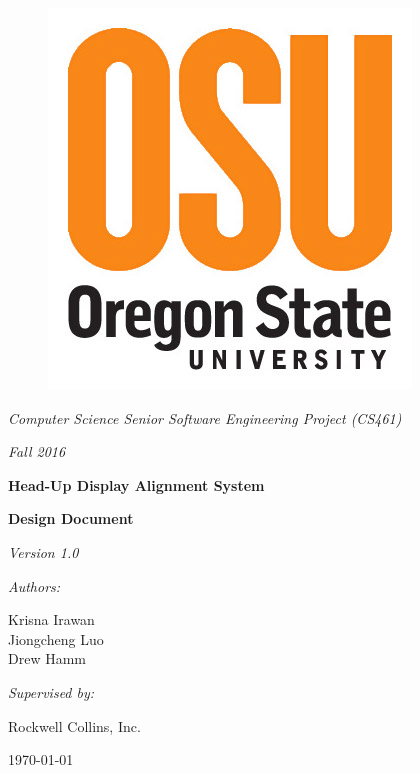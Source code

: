 \documentclass[letterpaper,10pt,onecolumn]{IEEEtran}
\def\name{Krisna Irawan\\ Jiongcheng Luo\\ Drew Hamm}
\def\doc{Design Document}
\def\version{Version 1.0}
\begin{document}
\begin{titlepage}
	\centering
	\begin{figure}
		\centering
	      	\includegraphics[scale=0.3]{osu_logo}
	\end{figure}
	{\Large\itshape Computer Science Senior Software Engineering Project (CS461)\par}
	{\Large\itshape Fall 2016\par}
	\vspace{1cm}
	{\huge\bfseries Head-Up Display Alignment System\par}
	\vspace{5mm}
	{\huge\bfseries \doc\par}
	\vspace{5mm}
	{\large\itshape \version\par}
	\vspace{1cm}
	{\large\itshape Authors:\par}
	{\large \name\par}
	\vspace{1cm}
	{\large\itshape Supervised by:\par}
	{\large Rockwell Collins, Inc.\par}
	\vspace{3cm}


	\begin{abstract}
		A Head-up Display (HUD) Alignment system is developed as a proof of concept aims to explore a potential technological innovation for the HUD system that presents critical flight information to pilots. The primary objective of this project is to reduce the cost and time required to precisely align flight information to the HUD by introducing an additional sensor component to the system to make the alignment process more dynamic. This document is intended for use by Rockwell Collins and their HUD system development team. This document provides and explains an overall system framework, design viewpoints and specific design description for each viewpoint within the system.
	\end{abstract}
	\vfill
	{\normalsize \today\par}

\end{titlepage}
\tableofcontents
\end{document}
